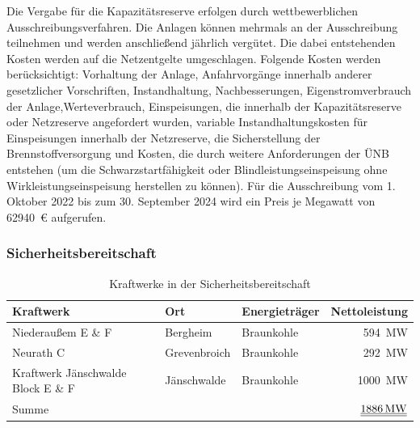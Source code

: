 			Die Vergabe für die Kapazitätsreserve erfolgen durch wettbewerblichen Ausschreibungsverfahren.
			Die Anlagen können mehrmals an der Ausschreibung teilnehmen und werden anschließend jährlich vergütet.
			Die dabei entstehenden Kosten werden auf die Netzentgelte umgeschlagen. 
			Folgende Kosten werden berücksichtigt: Vorhaltung der Anlage, Anfahrvorgänge innerhalb anderer gesetzlicher Vorschriften, Instandhaltung, Nachbesserungen, Eigenstromverbrauch der Anlage,Werteverbrauch, Einspeisungen, die innerhalb der Kapazitätsreserve oder Netzreserve angefordert wurden, variable Instandhaltungskosten für Einspeisungen innerhalb der Netzreserve, die Sicherstellung der Brennstoffversorgung und Kosten, die durch weitere Anforderungen der ÜNB entstehen (um die Schwarzstartfähigkeit oder Blindleistungseinspeisung ohne Wirkleistungseinspeisung herstellen zu können).	
			Für die Ausschreibung vom 1. Oktober 2022 bis zum 30. September 2024 wird ein Preis je Megawatt von \SI{62940}{\euro} aufgerufen.
		
		\subsubsection{Sicherheitsbereitschaft}
		
			\begin{table}[H]
				\centering
				\caption{Kraftwerke in der Sicherheitsbereitschaft \cite{Excel_Kraftwerksliste}}
				\label{Tab. Kraftwerke Sicherheitsbereitschaft}
				\begin{tabular}{lllr}
					\hline
					Kraftwerk & Ort & Energieträger & Nettoleistung \\ \hline
					Niederaußem E \& F & Bergheim & Braunkohle & \SI{594}{\mega\watt} \\
					Neurath C & Grevenbroich & Braunkohle & \SI{292 }{\mega\watt} \\
					Kraftwerk Jänschwalde Block E \& F & Jänschwalde & Braunkohle & \SI{1000}{\mega\watt} \\ \hline
					Summe &  &  & $\underline{\underline{\SI{1886}{\mega\watt}}}$ \\ \hline
				\end{tabular}
			\end{table}